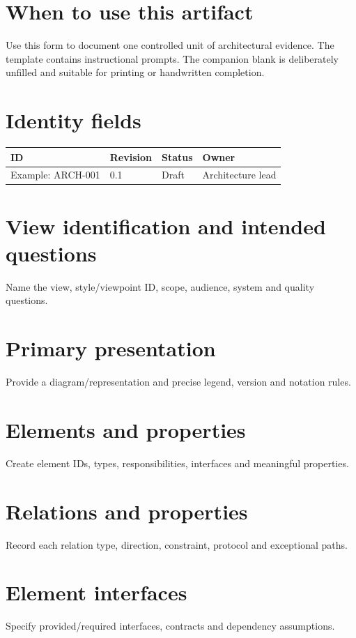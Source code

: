\documentclass[10pt,letterpaper]{article}
\begin{document}
\DocProvenance
\section{When to use this artifact}
Use this form to document one controlled unit of architectural evidence. The template contains instructional prompts. The companion blank is deliberately unfilled and suitable for printing or handwritten completion.

\section{Identity fields}
\small
\begin{tabularx}{\linewidth}{@{}YYYY@{}}
\toprule
\textbf{ID} & \textbf{Revision} & \textbf{Status} & \textbf{Owner} \\
\midrule
Example: ARCH-001 & 0.1 & Draft & Architecture lead \\
\bottomrule
\end{tabularx}
\normalsize
\section{View identification and intended questions}
Name the view, style/viewpoint ID, scope, audience, system and quality questions.

\section{Primary presentation}
Provide a diagram/representation and precise legend, version and notation rules.

\section{Elements and properties}
Create element IDs, types, responsibilities, interfaces and meaningful properties.

\section{Relations and properties}
Record each relation type, direction, constraint, protocol and exceptional paths.

\section{Element interfaces}
Specify provided/required interfaces, contracts and dependency assumptions.
\end{document}

